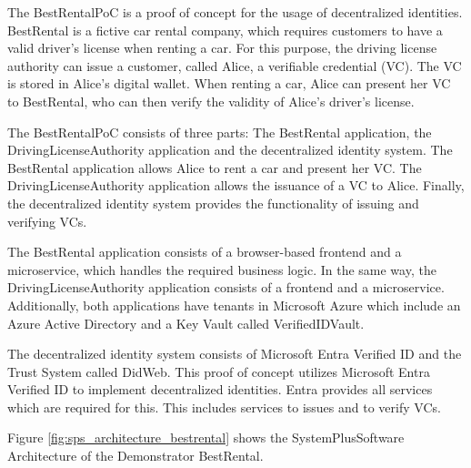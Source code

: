 The BestRentalPoC is a proof of concept for the usage of decentralized identities.
BestRental is a fictive car rental company, which requires customers to have a valid driver's license
when renting a car.
For this purpose, the driving license authority can issue a customer, called Alice, a verifiable credential (VC).
The VC is stored in Alice's digital wallet.
When renting a car, Alice can present her VC to BestRental, who can then verify the validity of Alice's driver's license.

The BestRentalPoC consists of three parts: The BestRental application, the DrivingLicenseAuthority application
and the decentralized identity system.
The BestRental application allows Alice to rent a car and present her VC.
The DrivingLicenseAuthority application allows the issuance of a VC to Alice.
Finally, the decentralized identity system provides the functionality of issuing and verifying VCs.

The BestRental application consists of a browser-based frontend and a microservice, which handles the required
business logic. In the same way, the DrivingLicenseAuthority application consists of a frontend and a microservice.
Additionally, both applications have tenants in Microsoft Azure which include an Azure Active Directory and
a Key Vault called VerifiedIDVault.

The decentralized identity system consists of Microsoft Entra Verified ID and the Trust System called DidWeb.
This proof of concept utilizes Microsoft Entra Verified ID to implement decentralized identities.
Entra provides all services which are required for this. This includes services to issues and to verify VCs.

Figure \ref{fig:sps_architecture_bestrental} shows the SystemPlusSoftware Architecture of the Demonstrator BestRental.

